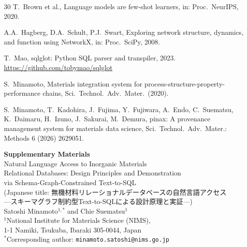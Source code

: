\documentclass{npj-compt.mater}
\begin{document}
\begin{thebibliography}{30}
T.~Brown et al.,
Language models are few-shot learners,
in: Proc.\ NeurIPS, 2020.

A.A.~Hagberg, D.A.~Schult, P.J.~Swart,
Exploring network structure, dynamics, and function using {NetworkX},
in: Proc.\ SciPy, 2008.

T.~Mao,
sqlglot: Python SQL parser and transpiler, 2023.
\url{https://github.com/tobymao/sqlglot}

S.~Minamoto,
Materials integration system for process-structure-property-performance chains,
Sci.\ Technol.\ Adv.\ Mater.\ (2020).

S.~Minamoto, T.~Kadohira, J.~Fujima, Y.~Fujiwara, A.~Endo, C.~Suematsu, K.~Daimaru, H.~Izuno, J.~Sakurai, M.~Demura,
pinax: A provenance management system for materials data science,
Sci.\ Technol.\ Adv.\ Mater.: Methods 6 (2026) 2629051.

\end{thebibliography}

\clearpage
\onecolumn
\appendix
\renewcommand{\thesection}{S\arabic{section}}
\renewcommand{\thetable}{S\arabic{table}}
\renewcommand{\thefigure}{S\arabic{figure}}
\renewcommand{\theequation}{S\arabic{equation}}
\setcounter{section}{0}
\setcounter{table}{0}
\setcounter{figure}{0}
\setcounter{equation}{0}

\begin{center}
  {\LARGE\bfseries Supplementary Materials}\\[0.8em]
  {\large Natural Language Access to Inorganic Materials\\
  Relational Databases: Design Principles and Demonstration\\
  via Schema-Graph-Constrained Text-to-SQL}\\[0.5em]
  {\large (Japanese title: 無機材料リレーショナルデータベースの自然言語アクセス\\
  ---スキーマグラフ制約型Text-to-SQLによる設計原理と実証---)}\\[1.0em]
  {\normalsize Satoshi Minamoto$^{1,*}$ and Chie Suematsu$^{1}$}\\[0.3em]
  {\small $^{1}$National Institute for Materials Science (NIMS),\\
  1-1 Namiki, Tsukuba, Ibaraki 305-0044, Japan}\\[0.3em]
  {\small $^{*}$Corresponding author: \texttt{minamoto.satoshi@nims.go.jp}}
\end{center}
\vspace{1.0em}
\noindent\hrulefill
\vspace{1.0em}
\end{document}
